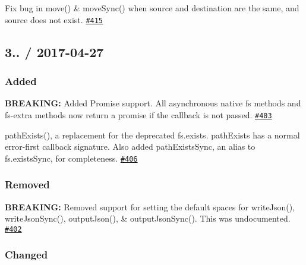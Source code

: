 
\begin{DoxyItemize}
\item Fix bug in {\ttfamily move()} \& {\ttfamily move\+Sync()} when source and destination are the same, and source does not exist. \href{https://github.com/jprichardson/node-fs-extra/pull/415}{\tt \#415}
\end{DoxyItemize}

\subsection*{3.. / 2017-\/04-\/27 }

\subsubsection*{Added}


\begin{DoxyItemize}
\item {\bfseries B\+R\+E\+A\+K\+I\+NG\+:} Added Promise support. All asynchronous native fs methods and fs-\/extra methods now return a promise if the callback is not passed. \href{https://github.com/jprichardson/node-fs-extra/pull/403}{\tt \#403}
\item {\ttfamily path\+Exists()}, a replacement for the deprecated {\ttfamily fs.\+exists}. {\ttfamily path\+Exists} has a normal error-\/first callback signature. Also added {\ttfamily path\+Exists\+Sync}, an alias to {\ttfamily fs.\+exists\+Sync}, for completeness. \href{https://github.com/jprichardson/node-fs-extra/pull/406}{\tt \#406}
\end{DoxyItemize}

\subsubsection*{Removed}


\begin{DoxyItemize}
\item {\bfseries B\+R\+E\+A\+K\+I\+NG\+:} Removed support for setting the default spaces for {\ttfamily write\+Json()}, {\ttfamily write\+Json\+Sync()}, {\ttfamily output\+Json()}, \& {\ttfamily output\+Json\+Sync()}. This was undocumented. \href{https://github.com/jprichardson/node-fs-extra/pull/402}{\tt \#402}
\end{DoxyItemize}

\subsubsection*{Changed}


